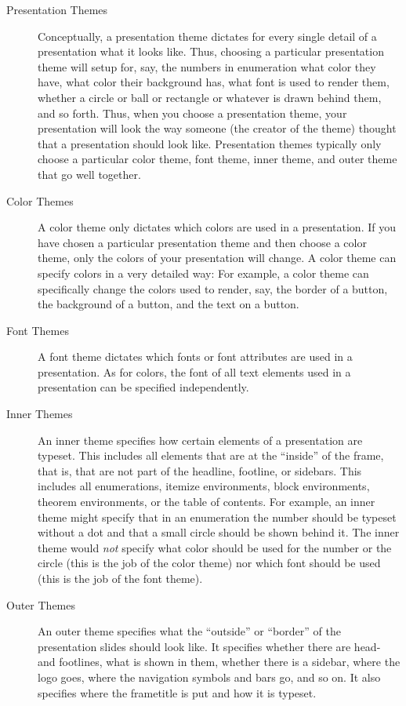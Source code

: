 \begin{description}
\item[Presentation Themes]
  Conceptually, a presentation theme dictates for every single detail of a presentation what it looks like. Thus, choosing a particular presentation theme will setup for, say, the numbers in enumeration what color they have, what color their background has, what font is used to render them, whether a circle or ball or rectangle or whatever is drawn behind them, and so forth. Thus, when you choose a presentation theme, your presentation will look the way someone (the creator of the theme) thought that a presentation should look like. Presentation themes typically only choose a particular color theme, font theme, inner theme, and outer theme that go well together.
\item[Color Themes]
  A color theme only dictates which colors are used in a presentation. If you have chosen a particular presentation theme and then choose a color theme, only the colors of your presentation will change. A color theme can specify colors in a very detailed way: For example, a color theme can specifically change the colors used to render, say, the border of a button, the background of a button, and the text on a button.
\item[Font Themes]
  A font theme dictates which fonts or font attributes are used in a presentation. As for colors, the font of all text elements used in a presentation can be specified independently.
\item[Inner Themes]
  An inner theme specifies how certain elements of a presentation are typeset. This includes all elements that are at the ``inside'' of the frame, that is, that are not part of the headline, footline, or sidebars. This includes all enumerations, itemize environments, block environments, theorem environments, or the table of contents. For example, an inner theme might specify that in an enumeration the number should be typeset without a dot and that a small circle should be shown behind it. The inner theme would \emph{not} specify what color should be used for the number or the circle (this is the job of the color theme) nor which font should be used (this is the job of the font theme).
\item[Outer Themes]
  An outer theme specifies what the ``outside'' or ``border'' of the presentation slides should look like. It specifies whether there are head- and footlines, what is shown in them, whether there is a sidebar, where the logo goes, where the navigation symbols and bars go, and so on. It also specifies where the frametitle is put and how it is typeset.
\end{description}

